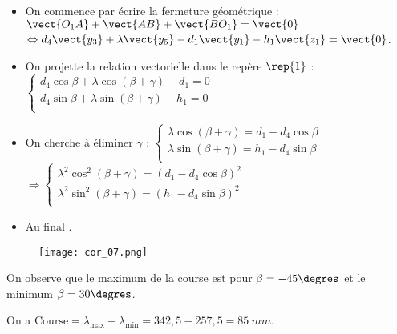 \ifprof
\begin{corrige}
\begin{itemize}
\item On commence par écrire la fermeture géométrique : $\vect{O_1A}+\vect{AB}+\vect{BO_1} = \vect{0}$ 
$ \Leftrightarrow d_4\vect{y_3} +\lambda\vect{y_5} - d_1\vect{y_1}-h_1\vect{z_1} = \vect{0}$.
\item On projette la relation vectorielle dans le repère $\rep{1}$ :
$\left\{
\begin{array}{l}
d_4\cos\beta +\lambda\cos(\beta+\gamma) - d_1= {0}  \\
d_4\sin\beta +\lambda\sin(\beta+\gamma) - h_1= {0}  \\
\end{array}
\right.$
\item On cherche à éliminer $\gamma$ :
$\left\{
\begin{array}{l}
\lambda\cos(\beta+\gamma) =d_1 - d_4\cos\beta  \\
\lambda\sin(\beta+\gamma)  = h_1  - d_4\sin\beta \\
\end{array}
\right.$ 
$ \Rightarrow \left\{
\begin{array}{l}
\lambda^2\cos^2(\beta+\gamma) =\left(d_1 - d_4\cos\beta \right)^2 \\
\lambda^2\sin^2(\beta+\gamma)  =\left( h_1  - d_4\sin\beta\right)^2 \\
\end{array}
\right.$ 
\item Au final .
\end{itemize}
\end{corrige}
\else
\fi



\ifprof
\begin{corrige}
\begin{figure}[H]
\centering
\texttt{[image: cor\_07.png]}
\end{figure}
On observe que le maximum de la course est pour $\beta=-45\degres$ et le minimum $\beta=30\degres$.

On a $\text{Course} = \lambda_{\text{max}}-\lambda_{\text{min}} = 342,5 - 257,5 = \SI{85}{mm}$.
\end{corrige}
\else
\fi



